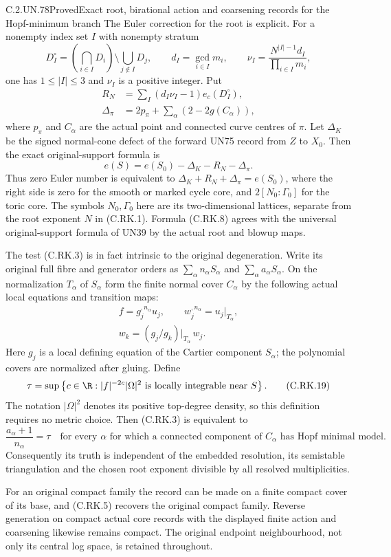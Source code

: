 \begin{statement}{C.2.UN.78}{Proved}{Exact root, birational action and coarsening records for the Hopf-minimum branch}
The Euler correction for the root is explicit.
For a nonempty index set $I$ with nonempty stratum
\[
 D_I^\circ=
    \left(\bigcap_{i\in I}D_i\right)
           \setminus\bigcup_{j\notin I}D_j,
 \qquad d_I=\gcd_{i\in I}m_i,
 \qquad \nu_I=\frac{N^{|I|-1}d_I}{\prod_{i\in I}m_i},
\tag{C.RK.6}
\]
one has $1\le|I|\le3$ and $\nu_I$ is a positive
integer. Put
\[
 \begin{split}
 R_N&=\sum_I(d_I\nu_I-1)e_c(D_I^\circ),\\
 \Delta_\pi&=2p_\pi+
                   \sum_\alpha(2-2g(C_\alpha)),
 \end{split}
\tag{C.RK.7}
\]
where $p_\pi$ and $C_\alpha$ are the actual point
and connected curve centres of $\pi$. Let
$\Delta_K$ be the signed normal-cone defect of
the forward UN75 record from $Z$ to $X_0$.
Then the exact original-support formula is
\[
                e(S)=e(S_0)-\Delta_K-R_N-\Delta_\pi.
\tag{C.RK.8}
\]
Thus zero Euler number is equivalent to
$\Delta_K+R_N+\Delta_\pi=e(S_0)$, where the
right side is zero for the smooth or marked
cycle core, and $2[N_0:\Gamma_0]$ for the
toric core. The symbols $N_0,\Gamma_0$ here
are its two-dimensional lattices, separate
from the root exponent $N$ in (C.RK.1).
Formula (C.RK.8) agrees with the universal
original-support formula of UN39 by the
actual root and blowup maps.

The test (C.RK.3) is in fact intrinsic to
the original degeneration. Write its original
full fibre and generator orders as
$\sum_\alpha n_\alpha S_\alpha$ and
$\sum_\alpha a_\alpha S_\alpha$.
On the normalization $T_\alpha$ of $S_\alpha$
form the finite normal cover $C_\alpha$
by the following actual local equations
and transition maps:
\[
 \begin{gathered}
 f=g_j^{,n_\alpha}u_j,\qquad
 w_j^{,n_\alpha}=u_j|_{T_\alpha},\\
 w_k=(g_j/g_k)|_{T_\alpha}\,w_j .
 \end{gathered}
\tag{C.RK.18}
\]
Here $g_j$ is a local defining equation
of the Cartier component $S_\alpha$;
the polynomial covers are normalized
after gluing. Define
\[
 \tau=\sup\left\{c\in\R:
       |f|^{-2c}|\Omega|^2\text{ is locally integrable
                              near }S\right\}.
\tag{C.RK.19}
\]
The notation $|\Omega|^2$ denotes its
positive top-degree density, so this
definition requires no metric choice.
Then (C.RK.3) is equivalent to
\[
 \frac{a_\alpha+1}{n_\alpha}=\tau
 \quad\text{for every }\alpha\text{ for which a connected
 component of }C_\alpha\text{ has Hopf minimal model}.
\tag{C.RK.20}
\]
Consequently its truth is independent
of the embedded resolution, its
semistable triangulation and the
chosen root exponent divisible by
all resolved multiplicities.

For an original compact family the record can
be made on a finite compact cover of its base,
and (C.RK.5) recovers the original compact
family. Reverse generation on compact actual
core records with the displayed finite action
and coarsening likewise remains compact.
The original endpoint neighbourhood, not only
its central log space, is retained throughout.
\end{statement}

